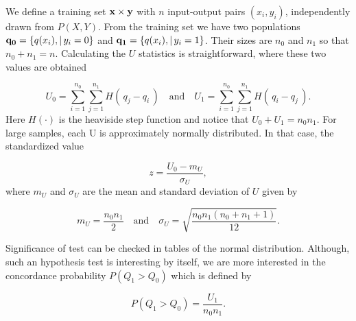 We define a training set $\bu{x} \times \bv{y}$ with $n$ input-output pairs $(x_i, y_i)$, independently drawn from $P(X,Y)$.  From the training set we have two populations $\bv{q_0} = \{q(x_i) , | \, y_i = 0 \}$ and $\bv{q_1} = \{q(x_i) , | \, y_i = 1 \}$.  Their sizes are $n_0$ and $n_1$ so that $n_0 + n_1 = n$.  Calculating the $U$ statistics is straightforward, where these two values are obtained 

\begin{equation}
\label{eq:U}
U_0 = \sum_{i=1}^{n_0}\sum_{j=1}^{n_1} H(\,q_j - q_i    \,) \quad \mbox{and} \quad 
U_1 = \sum_{i=1}^{n_0}\sum_{j=1}^{n_1} H( \,q_i - q_j    \,).
\end{equation}
Here $H(\cdot)$ is the heaviside step function and notice that $U_0 + U_1 = n_0n_1$.  For large samples, each U is approximately normally distributed. In that case, the standardized value

\begin{equation}
\label{eq:z}
z = \frac{U_0 - m_{U}}{\sigma_{U}},
\end{equation}
where $m_U$ and $\sigma_U$ are the mean and standard deviation of $U$ given by

\begin{equation}
\label{eq:z}
m_U = \frac{n_0n_1}{2} \quad \mbox{and} \quad 
\sigma_U = \sqrt{\frac{n_0n_1(n_0 + n_1 + 1)}{12} }.
\end{equation}

Significance of test can be checked in tables of the normal distribution.  Although, such an hypothesis test is interesting by itself, we are more interested in the concordance probability $P(Q_1 > Q_0)$ which is defined by

\begin{equation}
\label{eq:concordance}
P(Q_1 > Q_0) = \frac{U_1}{n_0n_1}.
\end{equation}






%
